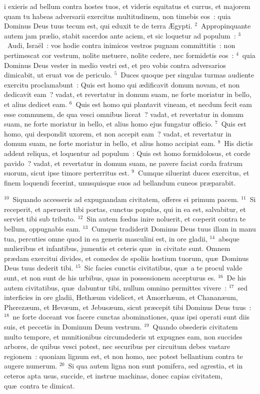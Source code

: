 \bchapter
{}i exieris ad bellum contra hostes tuos, et videris equitatus et currus, et majorem quam tu habeas adversarii exercitus multitudinem, non timebis eos~: quia Dominus Deus tuus tecum est, qui eduxit te de terra \AE gypti.
${}^{2}$~Appropinquante autem jam pr\ae lio, stabit sacerdos ante aciem, et sic loquetur ad populum~:
${}^{3}$~Audi, Isra\"el~: vos hodie contra inimicos vestros pugnam committitis~: non pertimescat cor vestrum, nolite metuere, nolite cedere, nec formidetis eos~:
${}^{4}$~quia Dominus Deus vester in medio vestri est, et pro vobis contra adversarios dimicabit, ut eruat vos de periculo.
${}^{5}$~Duces quoque per singulas turmas audiente exercitu proclamabunt~: Quis est homo qui \ae dificavit domum novam, et non dedicavit eam~? vadat, et revertatur in domum suam, ne forte moriatur in bello, et alius dedicet eam.
${}^{6}$~Quis est homo qui plantavit vineam, et necdum fecit eam esse communem, de qua vesci omnibus liceat~? vadat, et revertatur in domum suam, ne forte moriatur in bello, et alius homo ejus fungatur officio.
${}^{7}$~Quis est homo, qui despondit uxorem, et non accepit eam~? vadat, et revertatur in domum suam, ne forte moriatur in bello, et alius homo accipiat eam.
${}^{8}$~His dictis addent reliqua, et loquentur ad populum~: Quis est homo formidolosus, et corde pavido~? vadat, et revertatur in domum suam, ne pavere faciat corda fratrum suorum, sicut ipse timore perterritus est.
${}^{9}$~Cumque siluerint duces exercitus, et finem loquendi fecerint, unusquisque suos ad bellandum cuneos pr\ae parabit.


${}^{10}$~Siquando accesseris ad expugnandam civitatem, offeres ei primum pacem.
${}^{11}$~Si receperit, et aperuerit tibi portas, cunctus populus, qui in ea est, salvabitur, et serviet tibi sub tributo.
${}^{12}$~Sin autem fœdus inire noluerit, et cœperit contra te bellum, oppugnabis eam.
${}^{13}$~Cumque tradiderit Dominus Deus tuus illam in manu tua, percuties omne quod in ea generis masculini est, in ore gladii,
${}^{14}$~absque mulieribus et infantibus, jumentis et ceteris qu\ae\ in civitate sunt. Omnem pr\ae dam exercitui divides, et comedes de spoliis hostium tuorum, qu\ae\ Dominus Deus tuus dederit tibi.
${}^{15}$~Sic facies cunctis civitatibus, qu\ae\ a te procul valde sunt, et non sunt de his urbibus, quas in possessionem accepturus es.
${}^{16}$~De his autem civitatibus, qu\ae\ dabuntur tibi, nullum omnino permittes vivere~:
${}^{17}$~sed interficies in ore gladii, Heth\ae um videlicet, et Amorrh\ae um, et Chanan\ae um, Pherez\ae um, et Hev\ae um, et Jebus\ae um, sicut pr\ae cepit tibi Dominus Deus tuus~:
${}^{18}$~ne forte doceant vos facere cunctas abominationes, quas ipsi operati sunt diis suis, et peccetis in Dominum Deum vestrum.
${}^{19}$~Quando obsederis civitatem multo tempore, et munitionibus circumdederis ut expugnes eam, non succides arbores, de quibus vesci potest, nec securibus per circuitum debes vastare regionem~: quoniam lignum est, et non homo, nec potest bellantium contra te augere numerum.
${}^{20}$~Si qua autem ligna non sunt pomifera, sed agrestia, et in ceteros apta usus, succide, et instrue machinas, donec capias civitatem, qu\ae\ contra te dimicat.

